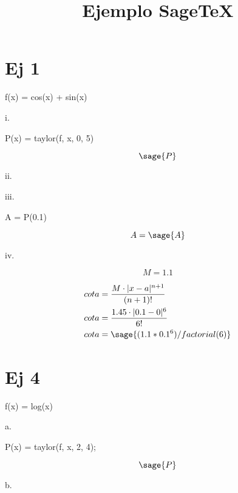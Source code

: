 \documentclass{amsart}
\title{Ejemplo SageTeX}
\begin{document}
	\section{Ej 1}
		
	\begin{sageblock}
		f(x) = cos(x) + sin(x)
	\end{sageblock}

	i.
	
	\begin{sageblock}
		P(x) = taylor(f, x, 0, 5)
	\end{sageblock}
	
	$$
		\sage{P}
	$$

	ii.
	
	iii.
	\begin{sageblock}
		A = P(0.1)
	\end{sageblock}
	
	$$ 	A = \sage{A} $$
	
	iv.
	
	
	$$ M = 1.1 $$
	
	\begin{align*}
		cota &= \frac{M \cdot |x - a|^{n+1}}{(n+1)!} \\
		cota &= \frac{1.45 \cdot |0.1 - 0|^6}{6!} \\
		cota &= \sage{(1.1*0.1^6)/factorial(6)}
	\end{align*}

	\section{Ej 4}
	
	\begin{sageblock}
		f(x) = log(x)
	\end{sageblock}
	
	a.
	
	\begin{sageblock}
		P(x) = taylor(f, x, 2, 4);
	\end{sageblock}

	$$ \sage{P} $$
	
	b.
	
	
\end{document}
